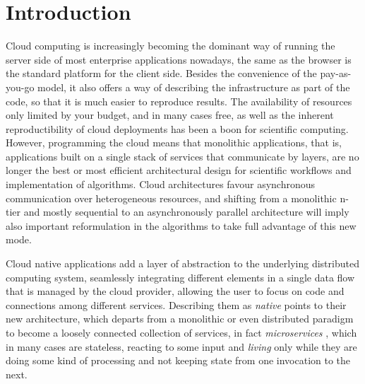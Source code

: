 \documentclass[sigconf]{acmart}
\begin{document}




\maketitle

\section{Introduction}

Cloud computing is increasingly becoming the dominant way of running
the server side of most enterprise applications nowadays, the same as the browser is
the standard platform for the client side. Besides the convenience of the pay-as-you-go
model, it also offers a way of describing the infrastructure as part
of the code, so that it is much easier to reproduce results.
The availability of resources only limited by your budget, and in many
cases free, as well as the inherent reproductibility of cloud
deployments has been a boon for scientific computing. However,
programming the cloud means that monolithic applications, that is,
applications built on a single stack of services that communicate by
layers, are no longer the best or most efficient architectural design
for scientific workflows and implementation of algorithms. Cloud
architectures favour asynchronous communication over heterogeneous
resources, and shifting from a monolithic n-tier and mostly sequential
to an asynchronously parallel architecture will imply also important
reformulation in the algorithms to take full advantage of this new
mode.

  Cloud native applications add a layer of abstraction to the
  underlying distributed computing system, seamlessly integrating
  different elements in a single data flow that is managed by the
  cloud provider, allowing the user to focus on code and connections
  among different services. Describing them as {\em native} points
  to their new architecture, which departs from a monolithic or even
  distributed paradigm to become a loosely connected collection of
services, in fact {\em microservices} \cite{microservices}, which in many cases are stateless, reacting to some input and
  {\em living} only while they are doing some kind of processing and
  not keeping state from one invocation to the next.
\end{document}
